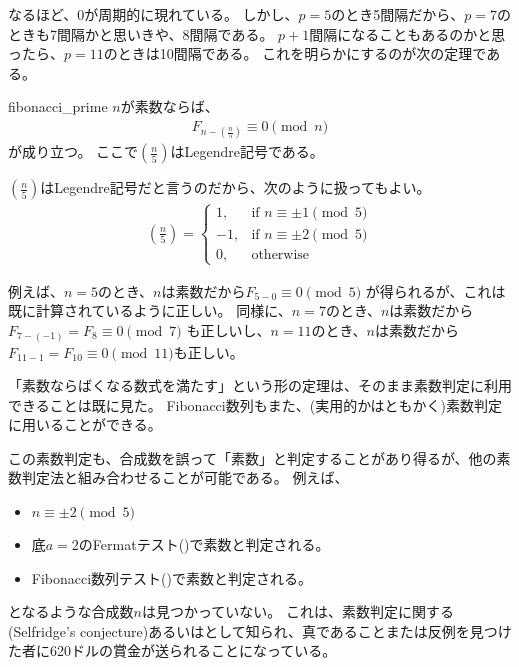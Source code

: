 なるほど、0が周期的に現れている。
しかし、$p=5$のとき5間隔だから、$p=7$のときも7間隔かと思いきや、8間隔である。
$p+1$間隔になることもあるのかと思ったら、$p=11$のときは10間隔である。
これを明らかにするのが次の定理である。

\begin{Theo}{}{fibonacci_prime}
$n$が素数ならば、
\begin{align*}
F_{n - \left(\frac{n}{5}\right)} \equiv 0 \pmod{n}
\end{align*}
が成り立つ。
ここで$\left(\frac{n}{5}\right)$はLegendre記号である。
\end{Theo}

$\left(\frac{n}{5}\right)$はLegendre記号だと言うのだから、次のように扱ってもよい。
\begin{align*}
\left(\frac{n}{5}\right) =
\begin{cases}
1, &\mbox{if }n \equiv \pm 1 \pmod{5}\\
-1, &\mbox{if }n \equiv \pm 2 \pmod{5}\\
0, &\mbox{otherwise}
\end{cases}
\end{align*}

例えば、$n=5$のとき、$n$は素数だから$F_{5 - 0} \equiv 0 \pmod{5}$
が得られるが、これは既に計算されているように正しい。
同様に、$n=7$のとき、$n$は素数だから
$F_{7 - (-1)} = F_{8} \equiv 0 \pmod{7}$
も正しいし、$n=11$のとき、$n$は素数だから
$F_{11 - 1} = F_{10} \equiv 0 \pmod{11}$も正しい。

「素数ならばくなる数式を満たす」という形の定理は、そのまま素数判定に利用できることは既に見た。
Fibonacci数列もまた、(実用的かはともかく)素数判定に用いることができる。


この素数判定も、合成数を誤って「素数」と判定することがあり得るが、他の素数判定法と組み合わせることが可能である。
例えば、
\begin{itemize}
 \item $n \equiv \pm 2 \pmod{5}$
 \item 底$a=2$のFermatテスト()で素数と判定される。
 \item Fibonacci数列テスト()で素数と判定される。
\end{itemize}
となるような合成数$n$は見つかっていない。
これは、素数判定に関する(Selfridge's conjecture)あるいはとして知られ、真であることまたは反例を見つけた者に620ドルの賞金が送られることになっている\cite{A_Computational_Perspective}。

